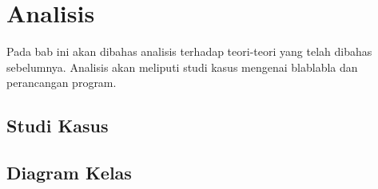 \chapter{Analisis}
\label{chap:analisis}

Pada bab ini akan dibahas analisis terhadap teori-teori yang telah dibahas sebelumnya. Analisis akan meliputi studi kasus mengenai blablabla dan perancangan program.

\section{Studi Kasus}

\section{Diagram Kelas}
